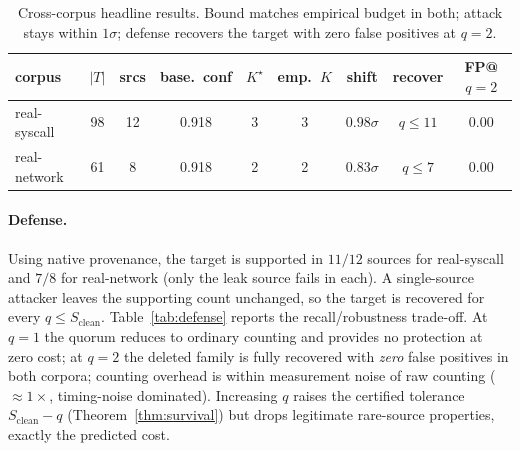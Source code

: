 \documentclass[runningheads]{llncs}
\begin{document}
\begin{table}[t]
\centering
\caption{Cross-corpus headline results. Bound matches empirical budget in both;
attack stays within $1\sigma$; defense recovers the target with zero false
positives at $q{=}2$.}
\label{tab:summary}
\begin{tabular}{lcccccccc}
\toprule
corpus & $|T|$ & srcs & base.\ conf & $K^\star$ & emp.\ $K$ & shift & recover & FP@$q{=}2$ \\
\midrule
real-syscall & 98 & 12 & 0.918 & 3 & 3 & $0.98\sigma$ & $q\le 11$ & 0.00 \\
real-network & 61 &  8 & 0.918 & 2 & 2 & $0.83\sigma$ & $q\le 7$  & 0.00 \\
\bottomrule
\end{tabular}
\end{table}

\paragraph{Defense.} Using native provenance, the target is supported in $11/12$
sources for real-syscall and $7/8$ for real-network (only the leak source fails in
each). A single-source attacker leaves the supporting count unchanged, so the
target is recovered for every $q\le S_{\mathrm{clean}}$.
Table~\ref{tab:defense} reports the recall/robustness trade-off. At $q{=}1$ the
quorum reduces to ordinary counting and provides no protection at zero cost; at
$q{=}2$ the deleted family is fully recovered with \emph{zero} false positives in
both corpora; counting overhead is within measurement noise of raw counting
(${\approx}1\times$, timing-noise dominated). Increasing $q$ raises the certified tolerance
$S_{\mathrm{clean}}-q$ (Theorem~\ref{thm:survival}) but drops legitimate
rare-source properties, exactly the predicted cost.
\end{document}
